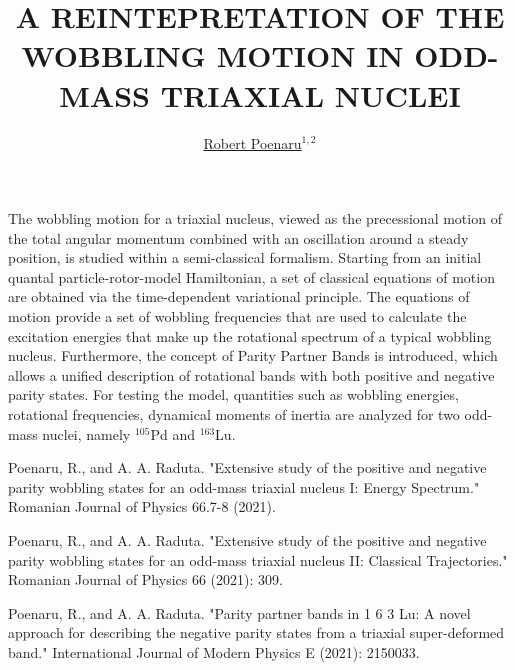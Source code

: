 ﻿\documentclass[a4paper,10pt,english]{article}
\begin{document}
\title{A REINTEPRETATION OF THE WOBBLING MOTION IN ODD-MASS TRIAXIAL NUCLEI}


\author{\uline{Robert Poenaru}$^{1,2}$}

\maketitle

\address{$^{1}$Department of Theoretical Physics, Horia Hulubei National Institute of Physics and Nuclear Engineering, Magurele, Romania}


\address{$^{2}$Doctoral School of Physics, University of Bucharest, Bucharest, Romania}



The wobbling motion for a triaxial nucleus, viewed as the precessional motion of the total angular momentum combined with an oscillation around a steady position, is studied within a semi-classical formalism. Starting from an initial quantal particle-rotor-model Hamiltonian, a set of classical equations of motion are obtained via the time-dependent variational principle. The equations of motion provide a set of wobbling frequencies that are used to calculate the excitation energies that make up the rotational spectrum of a typical wobbling nucleus. Furthermore, the concept of Parity Partner Bands is introduced, which allows a unified description of rotational bands with both positive and negative parity states. For testing the model, quantities such as wobbling energies, rotational frequencies, dynamical moments of inertia are analyzed for two odd-mass nuclei, namely $^{105}$Pd and $^{163}$Lu.

\begin{thebibliography}{References}

 Poenaru, R., and A. A. Raduta. "Extensive study of the positive and negative parity wobbling states for an odd-mass triaxial nucleus I: Energy Spectrum." Romanian Journal of Physics 66.7-8 (2021).

 Poenaru, R., and A. A. Raduta. "Extensive study of the positive and negative parity wobbling states for an odd-mass triaxial nucleus II: Classical Trajectories." Romanian Journal of Physics 66 (2021): 309.

 Poenaru, R., and A. A. Raduta. "Parity partner bands in 1 6 3 Lu: A novel approach for describing the negative parity states from a triaxial super-deformed band." International Journal of Modern Physics E (2021): 2150033.

\end{thebibliography}
\end{document}
